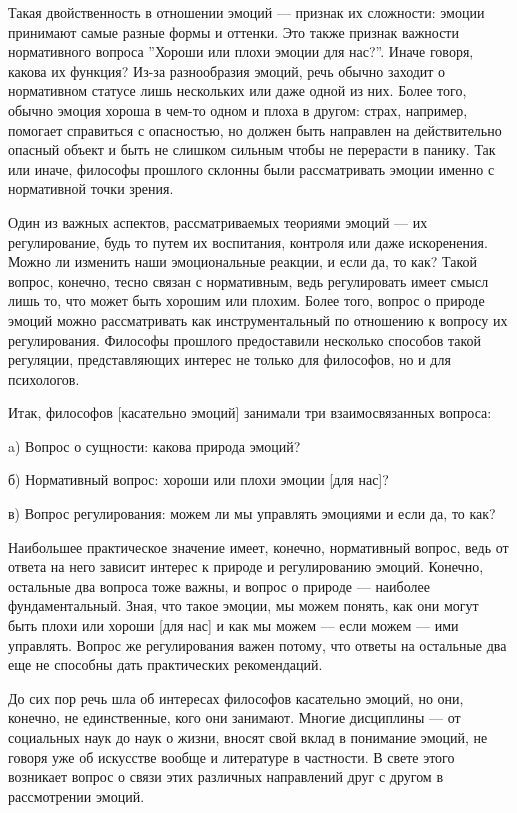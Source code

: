 \documentclass[11pt]{book}
\begin{document}
Такая двойственность в отношении эмоций --- признак их сложности: эмоции принимают самые разные формы и оттенки. Это также признак важности нормативного вопроса ''Хороши или плохи эмоции для нас?''. Иначе говоря, какова их функция? Из-за разнообразия эмоций, речь обычно заходит о нормативном статусе лишь нескольких или даже одной из них. Более того, обычно эмоция хороша в чем-то одном и плоха в другом: страх, например, помогает справиться с опасностью, но должен быть направлен на действительно опасный объект и быть не слишком сильным чтобы не перерасти в панику. Так или иначе, философы прошлого склонны были рассматривать эмоции именно с нормативной точки зрения.

Один из важных аспектов, рассматриваемых теориями эмоций --- их регулирование, будь то путем их воспитания, контроля или даже искоренения. Можно ли изменить наши эмоциональные реакции, и если да, то как? Такой вопрос, конечно, тесно связан с нормативным, ведь регулировать имеет смысл лишь то, что может быть хорошим или плохим. Более того, вопрос о природе эмоций можно рассматривать как инструментальный по отношению к вопросу их регулирования. Философы прошлого предоставили несколько способов такой регуляции, представляющих интерес не только для философов, но и для психологов.

Итак, философов [касательно эмоций] занимали три взаимосвязанных вопроса:

\smallskip

a) Вопрос о сущности: какова природа эмоций?

б) Нормативный вопрос: хороши или плохи эмоции [для нас]?

в) Вопрос регулирования: можем ли мы управлять эмоциями и если да, то как?

\smallskip

Наибольшее практическое значение имеет, конечно, нормативный вопрос, ведь от ответа на него зависит интерес к природе и регулированию эмоций. Конечно, остальные два вопроса тоже важны, и вопрос о природе --- наиболее фундаментальный. Зная, что такое эмоции, мы можем понять, как они могут быть плохи или хороши [для нас] и как мы можем --- если можем --- ими управлять. Вопрос же регулирования важен потому, что ответы на остальные два еще не способны дать практических рекомендаций.

До сих пор речь шла об интересах философов касательно эмоций, но они, конечно, не единственные, кого они занимают. Многие дисциплины --- от социальных наук до наук о жизни, вносят свой вклад в понимание эмоций, не говоря уже об искусстве вообще и литературе в частности. В свете этого возникает вопрос о связи этих различных направлений друг с другом в рассмотрении эмоций.
\end{document}
